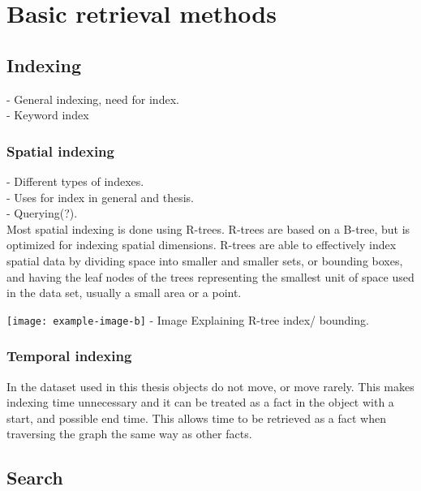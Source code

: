 
\chapter{Basic retrieval methods}

\section{Indexing}

- General indexing, need for index.\\
- Keyword index\\

\subsection{Spatial indexing}
- Different types of indexes.\\
- Uses for index in general and thesis.\\
- Querying(?).\\
Most spatial indexing is done using R-trees. R-trees are based on a B-tree, but is optimized for indexing spatial dimensions. R-trees are able to effectively index spatial data by dividing space into smaller and smaller sets, or bounding boxes, and having the leaf nodes of the trees representing the smallest unit of space used in the data set, usually a small area or a point.

\texttt{[image: example-image-b]}
- Image Explaining R-tree index/ bounding.

\subsection{Temporal indexing}
In the dataset used in this thesis objects do not move, or move rarely. This makes indexing time unnecessary and it can be treated as a fact in the object with a start, and possible end time. This allows time to be retrieved as a fact when traversing the graph the same way as other facts.

\section{Search}
